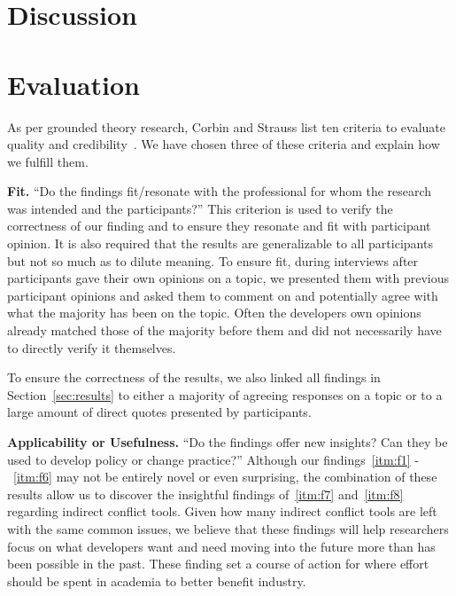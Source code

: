 \documentclass[conference]{IEEEtran}
\begin{document}
\section{Discussion}
\label{sec:disc}






















\section{Evaluation}
\label{sec:eval}

As per grounded theory research, Corbin and Strauss list ten criteria to evaluate quality and credibility~\cite{Corbin:1998:SP}.
We have chosen three of these criteria and explain how we fulfill them.

{\bfseries Fit.} ``Do the findings fit/resonate with the professional for whom the research was intended and the participants?'' This
criterion is used to verify the correctness of our finding and to ensure they resonate and fit with participant opinion. It is also
required that the results are generalizable to all participants but not so much as to dilute meaning. To ensure fit, during interviews
after participants gave their own opinions on a topic, we presented them with previous participant opinions and asked them to comment
on and potentially agree with what the majority has been on the topic. Often the developers own opinions already matched those of
the majority before them and did not necessarily have to directly verify it themselves.

To ensure the correctness of the results, we also linked all findings in Section~\ref{sec:results} to either a majority of agreeing
responses on a topic or to a large amount of direct quotes presented by participants.

{\bfseries Applicability or Usefulness.} ``Do the findings offer new insights? Can they be used to develop policy or change practice?''
Although our findings~\ref{itm:f1} -~\ref{itm:f6} may not be entirely novel or even surprising, the combination of these results allow us to discover the
insightful findings of~\ref{itm:f7} and~\ref{itm:f8} regarding indirect conflict tools. Given how many indirect conflict tools are left with the same common
issues, we believe that these findings will help researchers focus on what developers want and need moving into the future more than has
been possible in the past. These finding set a course of action for where effort should be spent in academia to better benefit industry.
\end{document}
